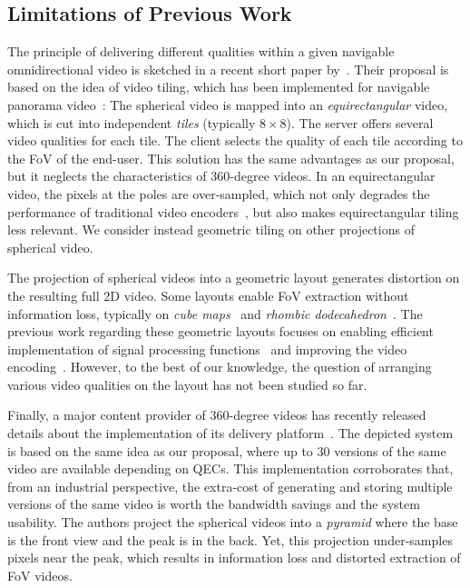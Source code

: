 \subsection{Limitations of Previous Work}

The principle of delivering different qualities within a given navigable omnidirectional video is sketched
in a recent short paper by~\citet{ochi_live_2015}. Their proposal is based on the idea of video
tiling, which has been implemented for navigable panorama
video~\cite{sanchez_compressed_2015,wang_mixing_2014,gaddam_tiling_2015}:
The spherical video is mapped into an \emph{equirectangular} video, which
is cut into independent \emph{tiles} (typically $8\times 8$). The server offers several
video qualities for each tile. The client selects the quality of each tile according to
the \ac{FoV} of the end-user. This
solution has the same advantages as our proposal, but it neglects
the characteristics of 360-degree
videos. In an equirectangular video, the pixels
at the poles are over-sampled, which not only degrades the
performance of traditional video encoders~\cite{wojciechowski_h.264_2006,yu_framework_2015}, but also
makes equirectangular tiling less relevant. We consider instead geometric tiling on
other projections of spherical video.


The projection of spherical videos into a geometric layout generates
distortion on the resulting
full 2D video. Some layouts enable \ac{FoV} extraction without information
loss, typically on \emph{cube maps}~\cite{Ng2005} and
\emph{rhombic dodecahedron}~\cite{fu_rhombic_2009}. The previous work regarding
these
geometric layouts focuses on enabling efficient implementation of signal processing
functions~\cite{kazhdan_metric-aware_2010} and improving the video
encoding~\cite{tosic_low_2009}.
However, to the best of our knowledge, the
question of arranging various video qualities on the layout has not been studied so far.

Finally, a major content provider of 360-degree videos has recently released details about the
implementation of its delivery platform~\cite{facebook}. The depicted system is based
on the same idea as our proposal, where up to 30 versions of the same video are available depending on
\acp{QEC}. This implementation corroborates that, from an industrial perspective, the
extra-cost of
generating and storing multiple versions of the same video is worth the bandwidth
savings and the system usability. The authors project the spherical videos into a \emph{pyramid}
where the
base is the front
view and the peak is in the back. Yet, this projection under-samples pixels near the peak,
which
results in
information loss and distorted extraction of \ac{FoV} videos. 


